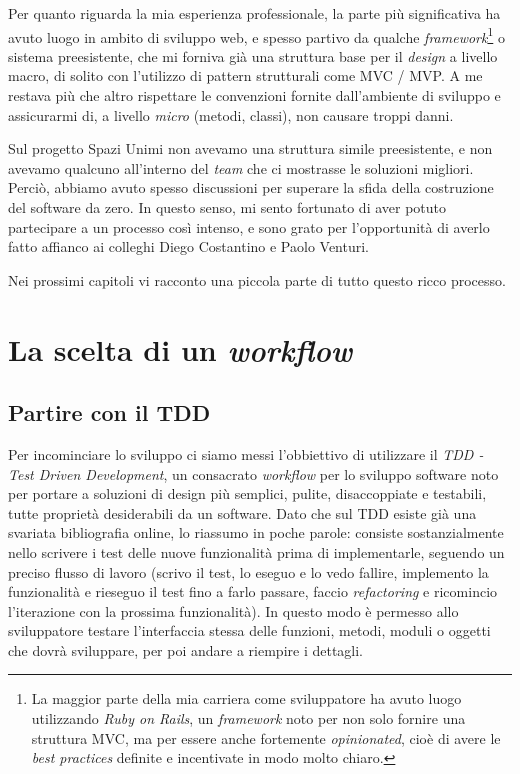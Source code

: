 \documentclass[12pt]{report}
\begin{document}
Per quanto riguarda la mia esperienza professionale, la parte più
significativa ha avuto luogo in ambito di sviluppo web, 
e spesso partivo da qualche
\textit{framework}\footnote{
	La maggior parte della mia carriera come sviluppatore ha avuto luogo
	utilizzando \textit{Ruby on Rails}, un \textit{framework} noto per non
	solo fornire una struttura MVC, ma per essere anche fortemente
	\textit{opinionated}, cioè di avere le \textit{best practices}
	definite e incentivate in modo molto chiaro.
} 
o sistema preesistente, che mi forniva già una struttura base
per il \textit{design} a livello macro, 
di solito con l'utilizzo di pattern strutturali come MVC / MVP.
A me restava più che altro rispettare le convenzioni fornite dall'ambiente di
sviluppo e assicurarmi di, a livello \textit{micro} (metodi, classi), non
causare troppi danni.

Sul progetto Spazi Unimi non avevamo una struttura simile preesistente, e non
avevamo qualcuno all'interno del \textit{team} che ci mostrasse le
soluzioni migliori. Perciò,  abbiamo avuto spesso discussioni per superare la
sfida della costruzione del software da zero. In questo senso,
mi sento fortunato di aver potuto partecipare a un processo
così intenso, e sono grato per l'opportunità di averlo fatto affianco
ai colleghi Diego Costantino e Paolo Venturi. 

Nei prossimi capitoli vi racconto una piccola parte di tutto questo ricco
processo.

% 
% 
\chapter{La scelta di un \textit{workflow}}
\label{cap:scelta_di_workflow}


\section{Partire con il TDD}

Per incominciare lo sviluppo ci siamo messi l'obbiettivo di utilizzare il
\textit{TDD - Test Driven Development}, un consacrato \textit{workflow} per lo
sviluppo software noto per portare a soluzioni di design più semplici, pulite,
disaccoppiate e testabili, tutte proprietà desiderabili da un software. Dato
che sul TDD esiste già una svariata bibliografia online, lo riassumo in poche
parole: consiste sostanzialmente nello scrivere i test delle nuove
funzionalità prima di implementarle, seguendo un preciso flusso di lavoro
(scrivo il test, lo eseguo e lo vedo fallire, implemento la funzionalità e
rieseguo il test fino a farlo passare, faccio \textit{refactoring} e
ricomincio l'iterazione con la prossima funzionalità). 
In questo modo è permesso allo
sviluppatore testare l'interfaccia stessa delle funzioni, metodi, moduli o
oggetti che dovrà sviluppare, per poi andare a riempire i dettagli.
\end{document}
